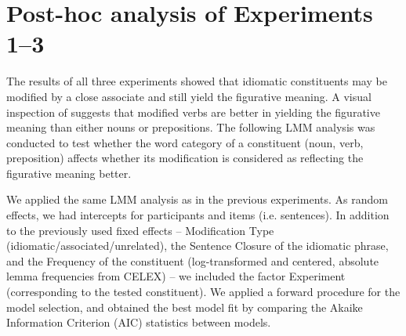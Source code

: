 \documentclass[output=paper]{langsci/langscibook}
\begin{document}
\begin{table}
\caption{Fixed effects of the predictors in the linear mixed-effect model for the paraphrase ratings in Experiment 3. \textit{Notes:} significance code: *** < 0.0001\label{tab:Table7}}
\end{table}


\section{Post-hoc analysis of Experiments 1--3}    

The results of all three experiments showed that idiomatic constituents may be modified by a close associate and still yield the figurative meaning. A visual inspection of  suggests that modified verbs are better in yielding the figurative meaning than either nouns or prepositions. The following LMM analysis was conducted to test whether the word category of a constituent (noun, verb, preposition) affects whether its modification is considered as reflecting the figurative meaning better. 

We applied the same LMM analysis as in the previous experiments. As random effects, we had intercepts for participants and items (i.e. sentences). In addition to the previously used fixed effects -- Modification Type (idiomatic\slash associated\slash unrelated), the Sentence Closure of the idiomatic phrase, and the Frequency of the constituent (log-transformed and centered, absolute lemma frequencies from CELEX) -- we included the factor Experiment (corresponding to the tested constituent).  We applied a forward procedure for the model selection, and obtained the best model fit by comparing the Akaike Information Criterion (AIC) statistics between models. 
\end{document}
